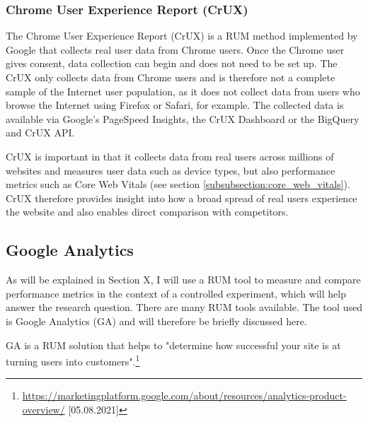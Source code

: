 


\subsubsection{Chrome User Experience Report (CrUX)} %

The Chrome User Experience Report (CrUX) is a RUM method implemented by Google that collects real user data from Chrome users.
Once the Chrome user gives consent, data collection can begin and does not need to be set up.
The CrUX only collects data from Chrome users and is therefore not a complete sample of the Internet user population, as it does not collect data from users who browse the Internet using Firefox or Safari, for example.
The collected data is available via Google's PageSpeed Insights, the CrUX Dashboard or the BigQuery and CrUX API. %

CrUX is important in that it collects data from real users across millions of websites and measures user data such as device types, but also performance metrics such as Core Web Vitals (see section \ref{subsubsection:core_web_vitals}).
CrUX therefore provides insight into how a broad spread of real users experience the website and also enables direct comparison with competitors.



\subsection{Google Analytics} %
\label{subsection:google_analytics}


As will be explained in Section X, I will use a RUM tool to measure and compare performance metrics in the context of a controlled experiment, which will help answer the research question.
There are many RUM tools available. 
The tool used is Google Analytics (GA) and will therefore be briefly discussed here.


GA is a RUM solution that helps to "determine how successful your site is at turning users into customers".\footnote{\url{https://marketingplatform.google.com/about/resources/analytics-product-overview/} [05.08.2021]}

